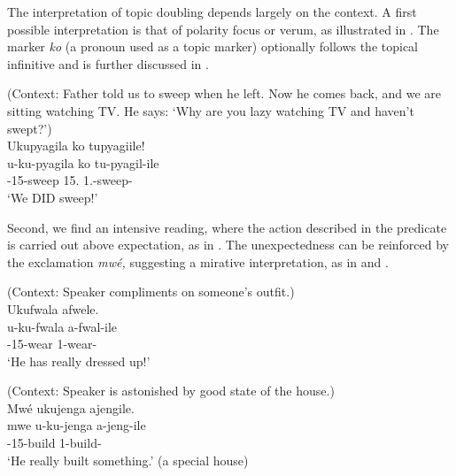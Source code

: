\documentclass[output=paper]{langscibook}
\begin{document}

\z


The interpretation of topic doubling depends largely on the context. A first possible interpretation is that of polarity focus or verum, as illustrated in . The marker \textit{ko} (a pronoun used as a topic marker) optionally follows the topical infinitive and is further discussed in .

\ea
\label{bkm:Ref110850439}
(Context: Father told us to sweep when he left. Now he comes back, and we are sitting watching TV. He says: ‘Why are you lazy watching TV and haven’t swept?’)\\
Ukupyagila ko tupyagiile!\\
\gll
u-ku-pyagila  ko  tu-pyagil-ile\\
\AUG{}-15-sweep  15.\PRO{}  1\PL.\SM{}-sweep-\PFV{}\\
\glt
‘We DID sweep!’

\z

Second, we find an intensive reading, where the action described in the predicate is carried out above expectation, as in . The unexpectedness can be reinforced by the exclamation \textit{mwé,} suggesting a mirative interpretation, as in  and .

\ea
\label{bkm:Ref136353381}
(Context: Speaker compliments on someone’s outfit.)\\
Ukufwala afwele.\\
\gll
u-ku-fwala  a-fwal-ile\\
\AUG{}-15-wear  1\SM{}-wear-\PFV{}\\
\glt
‘He has really dressed up!’\\

\z


\ea
\label{bkm:Ref136353384}
(Context: Speaker is astonished by good state of the house.)\\
Mwé ukujenga ajengile.\\
\gll
mwe  u-ku-jenga  a-jeng-ile\\
\EXCLAM{}  \AUG{}-15-build  1\SM{}-build-\PFV{}\\
\glt
‘He really built something.’ (a special house)\\
\end{document}
